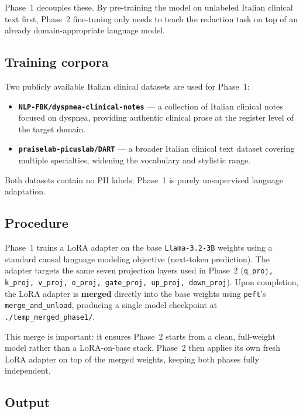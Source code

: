 \documentclass[11pt,a4paper]{article}
\begin{document}
Phase~1 decouples these. By pre-training the model on unlabeled Italian clinical text first, Phase~2 fine-tuning only needs to teach the redaction task on top of an already domain-appropriate language model.

\subsection{Training corpora}

Two publicly available Italian clinical datasets are used for Phase~1:

\begin{itemize}[leftmargin=*,topsep=4pt,itemsep=2pt]
  \item \textbf{\texttt{NLP-FBK/dyspnea-clinical-notes}} — a collection of Italian clinical notes focused on dyspnea, providing authentic clinical prose at the register level of the target domain.
  \item \textbf{\texttt{praiselab-picuslab/DART}} — a broader Italian clinical text dataset covering multiple specialties, widening the vocabulary and stylistic range.
\end{itemize}

Both datasets contain no PII labels; Phase~1 is purely unsupervised language adaptation.

\subsection{Procedure}

Phase~1 trains a LoRA adapter \cite{hu2021lora} on the base \texttt{Llama-3.2-3B} weights using a standard causal language modeling objective (next-token prediction). The adapter targets the same seven projection layers used in Phase~2 (\texttt{q\_proj, k\_proj, v\_proj, o\_proj, gate\_proj, up\_proj, down\_proj}). Upon completion, the LoRA adapter is \textbf{merged} directly into the base weights using \texttt{peft}'s \texttt{merge\_and\_unload}, producing a single model checkpoint at \texttt{./temp\_merged\_phase1/}.

This merge is important: it ensures Phase~2 starts from a clean, full-weight model rather than a LoRA-on-base stack. Phase~2 then applies its own fresh LoRA adapter on top of the merged weights, keeping both phases fully independent.

\subsection{Output}
\end{document}
